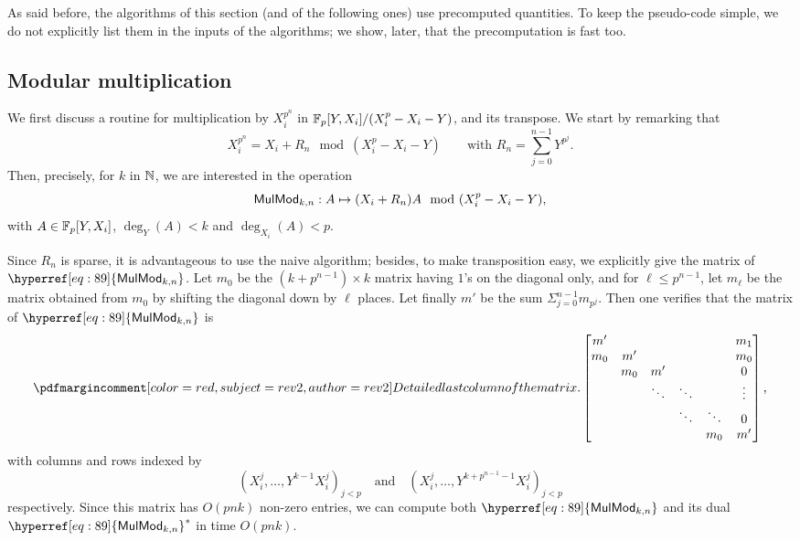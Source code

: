 As said before, the algorithms of this section (and of the following
ones) use precomputed quantities. To keep the pseudo-code simple, we
do not explicitly list them in the inputs of the algorithms;
we show, later, that the precomputation is fast too.


\subsection{Modular multiplication}
\label{ssec:mulmod}

We first discuss a routine for multiplication by $X_i^{p^n}$
in $\mathbb{F}_p[Y,X_i]/(X_i^p-X_i-Y)$, and its transpose. We start by
remarking that 
\begin{equation}
  \label{eq:Kn}
  X_i^{p^n}=X_i+R_n \mod (X_i^p-X_i-Y) \qquad\text{with }
  R_n = \sum_{j=0}^{n-1} Y^{p^j}
  \text{.}
\end{equation}
Then, precisely, for $k$ in $\mathbb{N}$, we are interested in the operation
\begin{equation}
  \label{eq:89}
  {\sf MulMod}_{k,n}: A \mapsto (X_i+R_n)A \mod (X_i^p-X_i-Y)
  \text{,}  
\end{equation}
with $A\in \mathbb{F}_p[Y,X_i]$, $\deg_Y(A) < k$ and $\deg_{X_i}(A) <p$.

Since $R_n$ is sparse, it is advantageous to use the naive algorithm;
besides, to make transposition easy, we explicitly give the matrix of
$\hyperref[eq:89]{\alg{MulMod}_{k,n}}$. Let $m_0$ be the
$(k+p^{n-1})\times k$ matrix having $1$'s on the diagonal only, and
for $\ell \le p^{n-1}$, let $m_\ell$ be the matrix obtained from $m_0$
by shifting the diagonal down by $\ell$ places. Let finally $m'$ be
the sum $\Sigma_{j=0}^{n-1} m_{p^j}$. Then one verifies that the
matrix of $\hyperref[eq:89]{\alg{MulMod}_{k,n}}$ is
\begin{equation}
  \pdfmctwo{Detailed last column of the matrix.}
  \begin{bmatrix}
    m'  &     &        &        &        & m_1 \\
    m_0 & m'  &        &        &        & m_0 \\
        & m_0 & m'     &        &        & 0   \\
        &     & \ddots & \ddots &        & \vdots\\
        &     &        & \ddots & \ddots & 0\\
        &     &        &        & m_0    & m'
  \end{bmatrix}
  \text{,}
\end{equation}
with columns and rows indexed by 
\begin{equation}
  \label{eq:90}
  (X_i^j,\dots,Y^{k-1}X_i^j)_{j < p}
  \quad\text{and}\quad
  (X_i^j,\dots,Y^{k+p^{n-1}-1}X_i^j)_{j < p}  
\end{equation}
respectively.  Since this matrix has $O(pnk)$ non-zero entries, we can
compute both $\hyperref[eq:89]{\alg{MulMod}_{k,n}}$ and its dual
$\dual{\hyperref[eq:89]{\alg{MulMod}_{k,n}}}$ in time $O(pnk)$.


